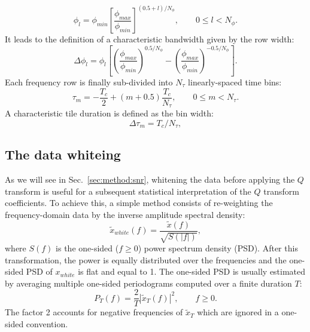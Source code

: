 \begin{equation}
  \phi_l = \phi_{min}\left[ \frac{\phi_{max}}{\phi_{min}}\right]^{(0.5+l)/N_\phi}, \qquad 0\le l < N_\phi.
  \label{eq:phi}
\end{equation}
It leads to the definition of a characteristic bandwidth given by the row width:
\begin{equation}
  \Delta\phi_l = \phi_{l} \left[ \left(\frac{\phi_{max}}{\phi_{min}}\right)^{0.5/N_\phi} - \left(\frac{\phi_{max}}{\phi_{min}}\right)^{-0.5/N_\phi} \right].
  \label{eq:dphi}
\end{equation}
Each frequency row is finally sub-divided into $N_\tau$ linearly-spaced time bins:
\begin{equation}
  \tau_m = -\frac{T_c}{2}+(m+0.5)\frac{T_c}{N_\tau}, \qquad 0\le m < N_\tau.
  \label{eq:tau}
\end{equation}
A characteristic tile duration is defined as the bin width:
\begin{equation}
  \Delta\tau_m = T_c / N_\tau,
  \label{eq:dtau}
\end{equation}


\subsection{The data whiteing} \label{sec:method:whitening}

As we will see in Sec.~\ref{sec:method:snr}, whitening the data before applying the $Q$ transform is useful for a subsequent statistical interpretation of the $Q$ transform coefficients. To achieve this, a simple method consists of re-weighting the frequency-domain data by the inverse amplitude spectral density:
\begin{equation}
  \tilde{x}_{white}(f) = \frac{\tilde{x}(f)}{\sqrt{S(|f|)}},
  \label{eq:whitening}
\end{equation}
where $S(f)$ is the one-sided ($f \ge 0$) power spectrum density (PSD). After this transformation, the power is equally distributed over the frequencies and the one-sided PSD of $x_{white}$ is flat and equal to 1. The one-sided PSD is usually estimated by averaging multiple one-sided periodograms computed over a finite duration $T$:
\begin{equation}
  P_T(f) = \frac{2}{T}\left|\tilde{x}_T(f)\right|^2, \qquad f \ge 0.
  \label{eq:periodogram}
\end{equation}
The factor 2 accounts for negative frequencies of $\tilde{x}_T$ which are ignored in a one-sided convention.


